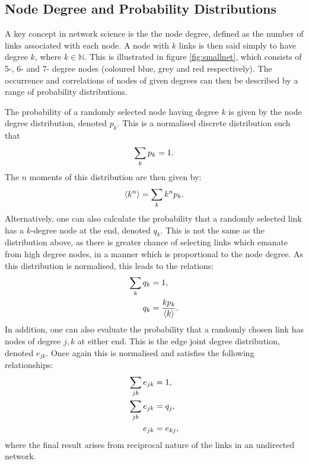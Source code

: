 \subsection{Node Degree and Probability Distributions} 
\label{s:theorynodeprob}

A key concept in network science is the the node degree, defined as the number of links associated with each node.
A node with $k$ links is then said simply to have degree $k$, where $k\in\mathbb{N}$.
This is illustrated in figure \ref{fig:smallnet}, which consists of 5\--, 6\-- and 7\-- degree nodes (coloured blue, grey and red respectively).
The occurrence and correlations of nodes of given degrees can then be described by a range of probability distributions.

The probability of a randomly selected node having degree $k$ is given by the node degree distribution, denoted $p_k$.
This is a normalised discrete distribution such that
\begin{equation}
	\label{eq:pknorm}
	\sum\limits_k p_k = 1.
\end{equation}
The $n$\th{} moments of this distribution are then given by:
\begin{equation}
	\label{eq:pkmoment}
	\langle k^{n} \rangle = \sum\limits_k k^np_k.
\end{equation}
Alternatively, one can also calculate the probability that a randomly selected link has a $k$\--degree node at the end, denoted $q_k$.
This is not the same as the distribution above, as there is greater chance of selecting links which emanate from high degree nodes, in a manner which is proportional to the node degree.
As this distribution is normalised, this leads to the relations:
\begin{align}
	\sum\limits_k q_k &= 1, \label{eq:qknorm} \\
	q_k &= \frac{kp_k}{\langle k \rangle} \label{eq:qkpk}.
\end{align}
In addition, one can also evaluate the probability that a randomly chosen link has nodes of degree $j,k$ at either end.
This is the edge joint degree distribution, denoted $e_{jk}$. 
Once again this is normalised and satisfies the following relationships:
\begin{align}
	\sum\limits_{jk} e_{jk} &= 1, \label{eq:ejknorm} \\
	\sum\limits_{jk} e_{jk} &= q_j, \label{eq:ejkqk} \\
	e_{jk} &= e_{kj} \label{eq:ejkekj},
\end{align}
where the final result arises from reciprocal nature of the links in an undirected network.
